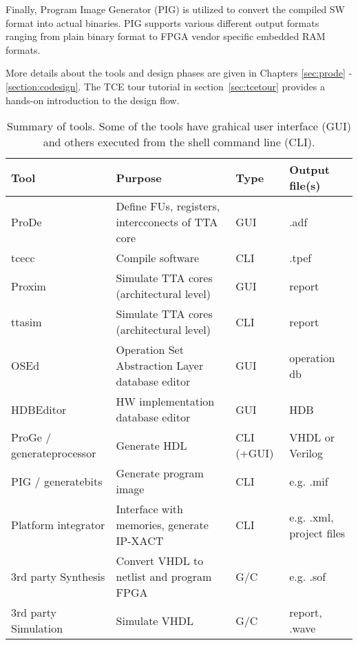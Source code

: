 \documentclass[twoside]{tceusermanual}
\begin{document}
Finally, Program Image Generator (PIG) is utilized to convert the 
compiled SW format into actual binaries. PIG supports various
different output formats ranging from plain binary format to FPGA
vendor specific embedded RAM formats.

More details about the tools and design phases are given in Chapters
\ref{sec:prode} - \ref{section:codesign}. The TCE tour tutorial in
section~\ref{sec:tcetour} provides a hands-on introduction to the design
flow.

\begin{table}
  \begin{center}
    \caption {Summary of tools. Some of the tools have grahical
    user interface (GUI) and others executed from the shell command
    line (CLI).}
    \label {tab:phases}
    \begin{tabular}{l | l | l | l }
      \hline
      Tool & Purpose & Type & Output file(s)\\
      \hline
      \hline
      ProDe                & Define FUs, registers, intercconects of TTA core & GUI  & .adf \\
      tcecc                & Compile software                                 & CLI  & .tpef \\
      Proxim               & Simulate TTA cores (architectural level)         & GUI  & report \\
      ttasim               & Simulate TTA cores (architectural level)         & CLI  & report \\
      OSEd                 & Operation Set Abstraction Layer database editor  & GUI  & operation db \\
      HDBEditor            & HW implementation database editor                & GUI  & HDB  \\
      \hline
      ProGe / generateprocessor             & Generate HDL                    & CLI (+GUI) & VHDL or Verilog \\
      PIG / generatebits   & Generate program image                           & CLI  & e.g. .mif  \\
      Platform integrator  & Interface with memories, generate IP-XACT        & CLI  & e.g. .xml, project files \\
      \hline
      3rd party Synthesis  & Convert VHDL to netlist and program FPGA         & G/C  &  e.g. .sof\\
      3rd party Simulation & Simulate VHDL                                    & G/C  &  report, .wave \\
      \hline
    \end{tabular}
  \end{center}
\end{table}
\end{document}
